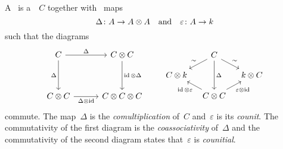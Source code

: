 \begin{definition}
  A~ is a~{\kvs}~$C$ together with~ maps
  \[
    \Delta \colon A \to A \otimes A
    \quad\text{and}\quad
    \varepsilon \colon A \to k
  \]
  such that the diagrams
  \[
    \begin{tikzcd}[column sep = 30pt, row sep = 35pt]
        C
        \arrow{r}[above]{\Delta}
        \arrow{d}[left]{\Delta}
      & C \tensor C
        \arrow{d}[right]{\id \tensor \Delta}
      \\
        C \tensor C
        \arrow{r}[below]{\Delta \tensor \id}
      & C \tensor C \tensor C
    \end{tikzcd}
    \quad\quad
    \begin{tikzcd}[column sep = 10pt, row sep = 10pt]
        {}
      & C
        \arrow{dl}[above left]{\sim}
        \arrow{dd}{\Delta}
        \arrow{dr}[above right]{\sim}
      & {}
      \\
        C \tensor k
      & {}
      & k \tensor C
      \\
        {}
      & C \tensor C
        \arrow{ul}[below left]{\id \tensor \varepsilon}
        \arrow{ur}[below right]{\varepsilon \tensor \id}
      & {}
    \end{tikzcd}
  \]
  commute.
  The map~$\Delta$ is the \emph{comultiplication} of~$C$ and~$\varepsilon$ is its \emph{counit}.
  The commutativity of the first diagram is the \emph{coassociativity} of~$\Delta$ and the commutativity of the second diagram states that~$\varepsilon$ is \emph{counitial}.
\end{definition}


%   
% 
% 


